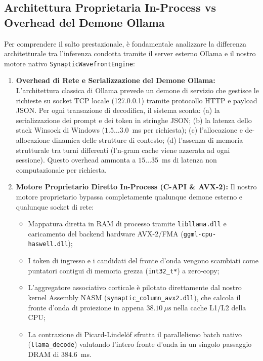 \documentclass[10pt,a4paper]{article}
\theoremstyle{definition}
\begin{document}
\subsection{Architettura Proprietaria In-Process vs Overhead del Demone Ollama}
Per comprendere il salto prestazionale, è fondamentale analizzare la differenza architetturale tra l'inferenza condotta tramite il server esterno Ollama e il nostro motore nativo \texttt{SynapticWavefrontEngine}:
\begin{enumerate}
    \item \textbf{Overhead di Rete e Serializzazione del Demone Ollama:}
    L'architettura classica di Ollama prevede un demone di servizio che gestisce le richieste su socket TCP locale (127.0.0.1) tramite protocollo HTTP e payload JSON. Per ogni transazione di decodifica, il sistema sconta: (a) la serializzazione dei prompt e dei token in stringhe JSON; (b) la latenza dello stack Winsock di Windows ($1.5 \dots 3.0$~ms per richiesta); (c) l'allocazione e de-allocazione dinamica delle strutture di contesto; (d) l'assenza di memoria strutturale tra turni differenti (l'n-gram cache viene azzerata ad ogni sessione). Questo overhead ammonta a $15 \dots 35$~ms di latenza non computazionale per richiesta.
    \item \textbf{Motore Proprietario Diretto In-Process (C-API \& AVX-2):}
    Il nostro motore proprietario bypassa completamente qualunque demone esterno e qualunque socket di rete:
    \begin{itemize}[leftmargin=1.5em]
        \item Mappatura diretta in RAM di processo tramite \texttt{libllama.dll} e caricamento del backend hardware AVX-2/FMA (\texttt{ggml-cpu-haswell.dll});
        \item I token di ingresso e i candidati del fronte d'onda vengono scambiati come puntatori contigui di memoria grezza (\texttt{int32\_t*}) a zero-copy;
        \item L'aggregatore associativo corticale è pilotato direttamente dal nostro kernel Assembly NASM (\texttt{synaptic\_column\_avx2.dll}), che calcola il fronte d'onda di proiezione in appena \textbf{$38.10\ \mu\text{s}$} nella cache L1/L2 della CPU;
        \item La contrazione di Picard-Lindelöf sfrutta il parallelismo batch nativo (\texttt{llama\_decode}) valutando l'intero fronte d'onda in un singolo passaggio DRAM di $384.6$~ms.
    \end{itemize}
\end{enumerate}
\end{document}
